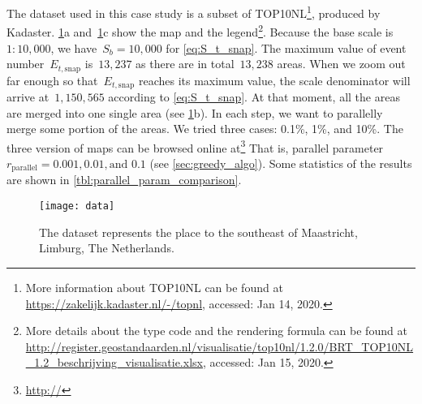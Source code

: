 \documentclass[ijgi,article,submit,moreauthors,pdftex]{Definitions/mdpi}
\begin{document}
The dataset used in this case study is a subset of TOP10NL\footnote{%
More information about TOP10NL can be found at
\url{https://zakelijk.kadaster.nl/-/topnl},
accessed: Jan 14, 2020.},
produced by Kadaster.
%
\figs\ref{fig:data}a and~\ref{fig:data}c show the map and the legend\footnote{%
More details about the type code and the rendering formula can be found at
\url{http://register.geostandaarden.nl/visualisatie/top10nl/1.2.0/BRT_TOP10NL_1.2_beschrijving_visualisatie.xlsx},
accessed: Jan 15, 2020.}.
%
Because the base scale is $1:10{,}000$, 
we have~$S_b = 10{,}000$ for \eq\ref{eq:S_t_snap}.
The maximum value of event number~$E_{t,\mathrm{snap}}$ is~$13{,}237$
as there are in total~$13{,}238$ areas.
When we zoom out far enough 
so that~$E_{t,\mathrm{snap}}$ reaches its maximum value,
the scale denominator will arrive at~$1{,}150{,}565$
according to \eq\ref{eq:S_t_snap}.
At that moment, all the areas are merged into one single area
(see \figs\ref{fig:data}b).
In each step, we want to parallelly merge some portion of the areas.
We tried three cases: 0.1\%, 1\%, and 10\%.
The three version of maps can be browsed online at\footnote{%
\url{http://}}
That is, parallel parameter~$r_\mathrm{parallel}=0.001, 0.01, \text{and~} 0.1$ 
(see \sect\ref{sec:greedy_algo}).
Some statistics of the results are shown in 
\tbl\ref{tbl:parallel_param_comparison}.

\begin{figure}[tb]
\centering
\texttt{[image: data]}
\caption{The dataset represents the place 
    to the southeast of Maastricht, Limburg, The Netherlands.}
\label{fig:data}
\end{figure}
\end{document}
